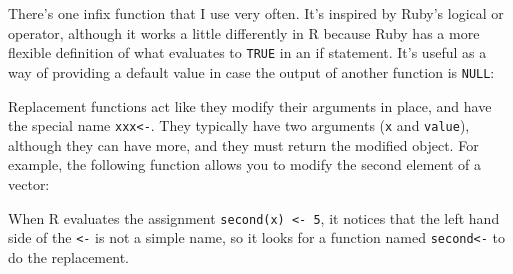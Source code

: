 There's one infix function that I use very often. It's inspired by
Ruby's \texttt{\textbar{}\textbar{}} logical or operator, although it
works a little differently in R because Ruby has a more flexible
definition of what evaluates to \texttt{TRUE} in an if statement. It's
useful as a way of providing a default value in case the output of
another function is \texttt{NULL}:

\begin{Shaded}
\end{Shaded}


Replacement functions act like they modify their arguments in place, and
have the special name \texttt{xxx\textless{}-}. They typically have two
arguments (\texttt{x} and \texttt{value}), although they can have more,
and they must return the modified object. For example, the following
function allows you to modify the second element of a vector:
 

\begin{Shaded}
\begin{Highlighting}[]
 \NormalTok{<-}\StringTok{ }
  \NormalTok{x[}\NormalTok{] <-}\StringTok{ }
\NormalTok{\}}
\StringTok{ }\NormalTok{:}
\StringTok{ }
\end{Highlighting}
\end{Shaded}

When R evaluates the assignment \texttt{second(x) \textless{}- 5}, it
notices that the left hand side of the \texttt{\textless{}-} is not a
simple name, so it looks for a function named
\texttt{second\textless{}-} to do the replacement.

